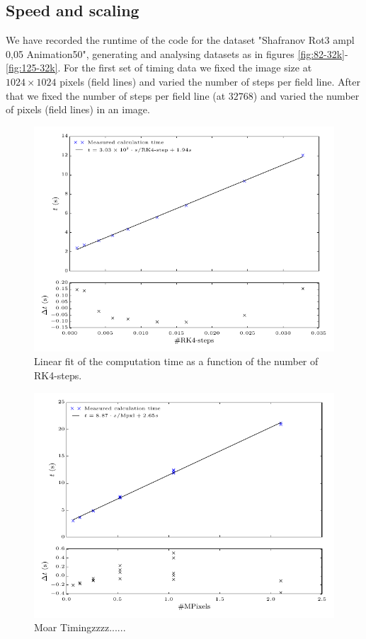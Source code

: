 \documentclass{article}
\begin{document}
\subsection{Speed and scaling}
We have recorded the runtime of the code for the dataset "Shafranov Rot3 ampl 0,05 Animation50", generating and analysing datasets as in figures \ref{fig:82-32k}-\ref{fig:125-32k}. For the first set of timing data we fixed the image size at $1024\times 1024$ pixels (field lines) and varied the number of steps per field line. After that we fixed the number of steps per field line (at $32768$) and varied the number of pixels (field lines) in an image.\\
\begin{figure}[!ht]
	\includegraphics[width=\linewidth]{Figures/timings_1.pdf}
	\caption{Linear fit of the computation time as a function of the number of RK4-steps.}\label{fig:timings1}
\end{figure}
\begin{figure}[!ht]
	\includegraphics[width=\linewidth]{Figures/timings_2.pdf}
	\caption{Moar Timingzzzz......}\label{fig:timings2}
\end{figure}
\end{document}
